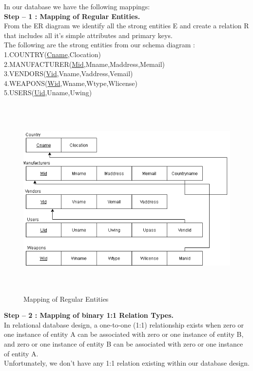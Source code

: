 \documentclass[12pt,a4paper]{report}
\begin{document}
In our database we have the following mappings:\\
\textbf{Step – 1 : Mapping of Regular Entities.}\\
From the ER diagram we identify all the strong entities E and create a relation R that includes all it’s simple attributes and primary keys.\\
The following are the strong entities from our schema diagram :\\
1.COUNTRY(\underline{Cname},Clocation)\\
2.MANUFACTURER(\underline{Mid},Mname,Maddress,Memail)\\
3.VENDORS(\underline{Vid},Vname,Vaddress,Vemail)\\
4.WEAPONS(\underline{Wid},Wname,Wtype,Wlicense)\\
5.USERS(\underline{Uid},Uname,Uwing)\\
\newpage
\begin{figure}[hbtp]
\includegraphics[width=5in,height=4.0in]{../fig/Regular}
\caption{Mapping of Regular Entities}
\end{figure}
\textbf{Step – 2 : Mapping of binary 1:1 Relation Types.}\\
In relational database design, a one-to-one (1:1) relationship exists when zero or one instance of entity A can be associated with zero or one instance of entity B, and zero or one instance of entity B can be associated with zero or one instance of entity A.\\
Unfortunately, we don't have any 1:1 relation existing within our database design.  \\
\end{document}
